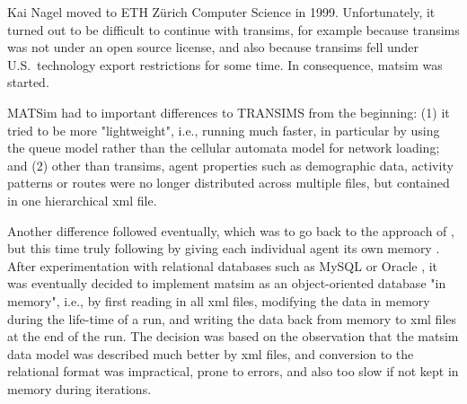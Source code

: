 Kai Nagel moved to ETH Zürich Computer Science in 1999.  Unfortunately, it turned out to be difficult to continue with \gls{transims}, for example because \gls{transims} was not under an open source license, and also because \gls{transims} fell under U.S.\ technology export restrictions for some time.  In consequence, \gls{matsim} was started.

MATSim had to important differences to TRANSIMS from the beginning: (1) it tried to be more "lightweight", i.e., running much faster, in particular by using the queue model \citep{GawronPhd,Gawron1998IterativeAlgorithmto} rather than the cellular automata model for network loading; and (2) other than \gls{transims}, agent properties such as demographic data, activity patterns or routes were no longer distributed across multiple files, but contained in one hierarchical \gls{xml} file.

Another difference followed eventually, which was to go back to the approach of \citet{Nagel1996NRW}, but this time truly following \citet{ArthurBar} by giving each individual agent its own memory \citep{RaneyNagel2006traf-framework}.  After experimentation with relational databases such as MySQL \citep{mysql-wikipedia} or Oracle \citep{oracle}, it was eventually decided to implement \gls{matsim} as an object-oriented database "in memory", i.e., by first reading in all \gls{xml} files, modifying the data in memory during the life-time of a run, and writing the data back from memory to \gls{xml} files at the end of the run.  The decision was based on the observation that the \gls{matsim} data model was described much better by \gls{xml} files, and conversion to the relational format was impractical, prone to errors, and also too slow if not kept in memory during iterations. 

